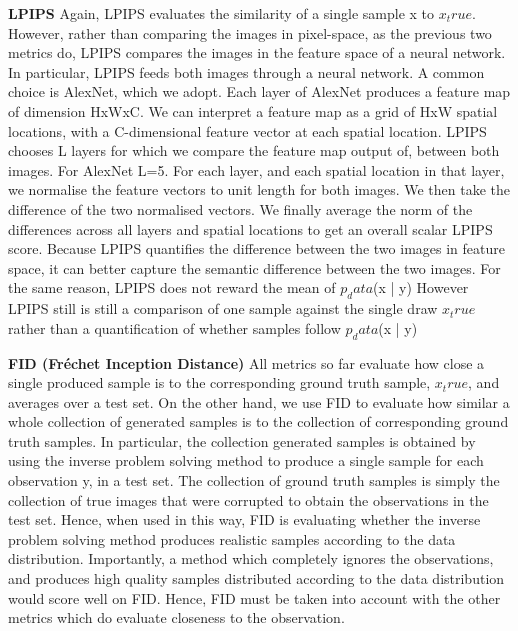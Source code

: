 \documentclass[12pt,a4paper]{report}
\begin{document}
\textbf{LPIPS}
Again, LPIPS evaluates the similarity of a single sample x to $x_true$. 
However, rather than comparing the images in pixel-space, as the previous two metrics do, LPIPS compares the images in the feature space of a neural network. 
In particular, LPIPS feeds both images through a neural network. A common choice is AlexNet, which we adopt. 
Each layer of AlexNet produces a feature map of dimension HxWxC. We can interpret a feature map as a grid of HxW spatial locations, with a C-dimensional feature vector at each spatial location.  
LPIPS chooses L layers for which we compare the feature map output of, between both images. For AlexNet L=5. 
For each layer, and each spatial location in that layer, we normalise the feature vectors to unit length for both images. We then take the difference of the two normalised vectors. 
We finally average the norm of the differences across all layers and spatial locations to get an overall scalar LPIPS score. 
Because LPIPS quantifies the difference between the two images in feature space, it can better capture the semantic difference between the two images. 
For the same reason, LPIPS does not reward the mean of $p_data$(x | y) 
However LPIPS still is still a comparison of one sample against the single draw $x_true$ rather than a quantification of whether samples follow $p_data$(x | y)


\textbf{FID (Fréchet Inception Distance)}
All metrics so far evaluate how close a single produced sample is to the corresponding ground truth sample, $x_true$, and averages over a test set. 
On the other hand, we use FID to evaluate how similar a whole collection of generated samples is to the collection of corresponding ground truth samples. 
In particular, the collection generated samples is obtained by using the inverse problem solving method to produce a single sample for each observation y, in a test set. 
The collection of ground truth samples is simply the collection of true images that were corrupted to obtain the observations in the test set. 
Hence, when used in this way, FID is evaluating whether the inverse problem solving method produces realistic samples according to the data distribution. 
Importantly, a method which completely ignores the observations, and produces high quality samples distributed according to the data distribution would score well on FID. 
Hence, FID must be taken into account with the other metrics which do evaluate closeness to the observation. 
\end{document}
